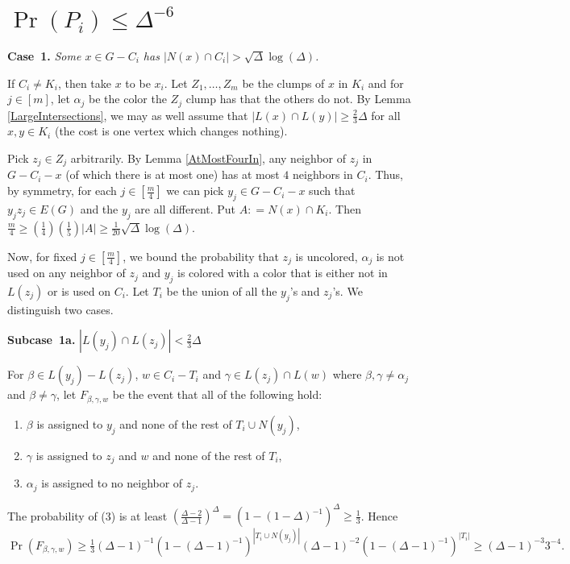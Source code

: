 \documentclass[12pt]{article}
\theoremstyle{plain}
\theoremstyle{definition}
\theoremstyle{remark}
\newcommand{\card}[1]{\left|#1\right|}
\newcommand{\irange}[1]{\left[#1\right]}
\newcommand{\parens}[1]{\left( #1 \right)}
\newcommand{\DefinedAs}{\mathrel{\mathop:}=}
\begin{document}
\section{$\Pr(P_i) \leq \Delta^{-6}$}
\textbf{Case~1.} \textit{Some $x \in G  - C_i$ has $\card{N(x) \cap C_i} >
\sqrt{\Delta}\log(\Delta)$.} 

If $C_i \neq K_i$, then take $x$ to be $x_i$. Let $Z_1, \ldots, Z_m$ be the
clumps of $x$ in $K_i$ and for $j \in \irange{m}$, let $\alpha_j$ be the color
the $Z_j$ clump has that the others do not.  By Lemma \ref{LargeIntersections}, we may as well assume that $\card{L(x) \cap
L(y)} \geq \frac23 \Delta$ for all $x,y \in K_i$ (the cost is one vertex which
changes nothing).

Pick $z_j \in Z_j$ arbitrarily.  By Lemma \ref{AtMostFourIn}, any neighbor of
$z_j$ in $G - C_i - x$ (of which there is at most one) has at most $4$ neighbors
in $C_i$.  Thus, by symmetry, for each $j \in \irange{\frac{m}{4}}$ we can pick
$y_j \in G - C_i - x$ such that $y_jz_j \in E(G)$ and the $y_j$ are all
different.  Put $A \DefinedAs N(x) \cap K_i$.  Then $\frac{m}{4} \geq
(\frac14)(\frac15)\card{A} \geq \frac{1}{20}\sqrt{\Delta}\log(\Delta)$.

Now, for fixed $j \in \irange{\frac{m}{4}}$, we bound the probability that $z_j$
is uncolored, $\alpha_j$ is not used on any neighbor of $z_j$ and $y_j$ is colored
with a color that is either not in $L(z_j)$ or is used on $C_i$.  Let $T_i$ be
the union of all the $y_j$'s and $z_j$'s. We distinguish two cases.

\textbf{Subcase~1a.} \textit{$\card{L(y_j) \cap L(z_j)} < \frac23 \Delta$}

For $\beta \in L(y_j) - L(z_j)$, $w \in C_i - T_i$ and $\gamma \in L(z_j) \cap
L(w)$ where $\beta, \gamma \neq \alpha_j$ and $\beta \neq \gamma$, let
$F_{\beta, \gamma, w}$ be the event that all of the following hold:

\begin{enumerate}
  \item $\beta$ is assigned to $y_j$ and none of the rest of $T_i \cup N(y_j)$,
  \item $\gamma$ is assigned to $z_j$ and $w$ and none of the rest of $T_i$,
  \item $\alpha_j$ is assigned to no neighbor of $z_j$.
\end{enumerate}

The probability of (3) is
at least $\parens{\frac{\Delta - 2}{\Delta - 1}}^{\Delta} = (1 -
(1-\Delta)^{-1})^\Delta \geq \frac13$. Hence $\Pr(F_{\beta, \gamma, w}) \geq
\frac13 (\Delta-1)^{-1}(1-(\Delta-1)^{-1})^{\card{T_i \cup
N(y_j)}}(\Delta-1)^{-2}(1 - (\Delta-1)^{-1})^{\card{T_i}} \geq
(\Delta-1)^{-3}3^{-4}.$
\end{document}
